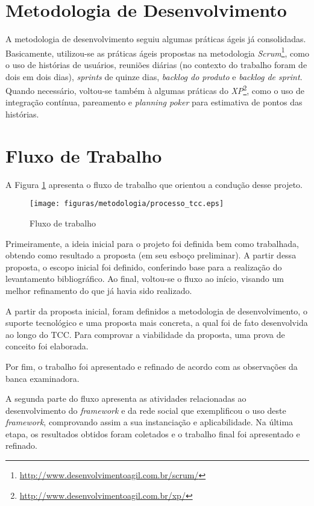 \section{Metodologia de Desenvolvimento}

A metodologia de desenvolvimento seguiu algumas práticas ágeis já consolidadas. Basicamente, utilizou-se as práticas ágeis propostas na metodologia \textit{Scrum}\footnote{\url{http://www.desenvolvimentoagil.com.br/scrum/}}, como o uso de histórias de usuários, reuniões diárias (no contexto do trabalho foram de dois em dois dias), \textit{sprints} de quinze dias, \textit{backlog do produto} e \textit{backlog de sprint}. Quando necessário, voltou-se também à algumas práticas do \textit{XP}\footnote{\url{http://www.desenvolvimentoagil.com.br/xp/}}, como o uso de integração contínua, pareamento e \textit{planning poker} para estimativa de pontos das histórias.

\section{Fluxo de Trabalho}

A Figura \ref{processo tcc} apresenta o fluxo de trabalho que orientou a condução desse projeto.

\begin{figure}[h]
	\centering
	\texttt{[image: figuras/metodologia/processo\_tcc.eps]}
	\caption{Fluxo de trabalho}
	\label{processo tcc}
\end{figure}

Primeiramente, a ideia inicial para o projeto foi definida bem como trabalhada, obtendo como resultado a proposta (em seu esboço preliminar). A partir dessa proposta, o escopo inicial foi definido, conferindo base para a realização do levantamento bibliográfico. Ao final, voltou-se o fluxo ao início, visando um melhor refinamento do que já havia sido realizado.

A partir da proposta inicial, foram definidos a metodologia de desenvolvimento, o suporte tecnológico e uma proposta mais concreta, a qual foi de fato desenvolvida ao longo do TCC. Para comprovar a viabilidade da proposta, uma prova de conceito foi elaborada.

Por fim, o trabalho foi apresentado e refinado de acordo com as observações da banca examinadora.

A segunda parte do fluxo apresenta as atividades relacionadas ao desenvolvimento do \textit{framework} e da rede social que exemplificou o uso deste \textit{framework}, comprovando assim a sua instanciação e aplicabilidade. Na última etapa, os resultados obtidos foram coletados e o trabalho final foi apresentado e refinado.

